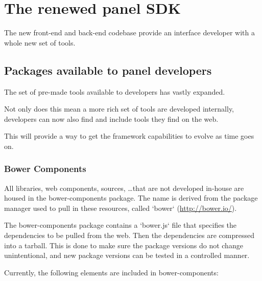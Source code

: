 \chapter{The renewed panel SDK}
The new front-end and back-end codebase provide an interface developer with a
whole new set of tools.

\section{Packages available to panel developers}
The set of pre-made tools available to developers has vastly expanded.

Not only does this mean a more rich set of tools are developed internally,
developers can now also find and include tools they find on the web.

This will provide a way to get the framework capabilities to evolve as time
goes on.

\subsection{Bower Components}
All libraries, web components, sources, \ldots that are not developed in-house
are housed in the bower-components package.
The name is derived from the package manager used to pull in these resources,
called `bower` (\url{http://bower.io/}).

The bower-components package contains a `bower.js` file that specifies the
dependencies to be pulled from the web.
Then the dependencies are compressed into a tarball. This is done to make sure
the package versions do not change unintentional, and new package versions can
be tested in a controlled manner.

Currently, the following elements are included in bower-components:

